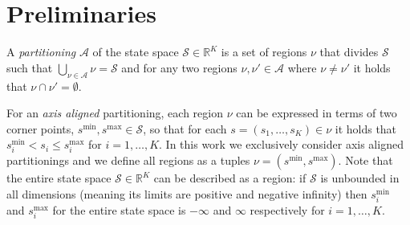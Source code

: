 \section {Preliminaries}%
\label {sec:preliminaries}




\begin {definition}
  \label {def:partitioning}
  A \emph {partitioning} \( \mathcal A \) of the state space $\mathcal{S} \in \mathbb{R}^K$ is a set of regions $\nu$ that divides $\mathcal{S}$ such that $\bigcup_{\nu \in \mathcal{A}}\nu = \mathcal{S}$ and for any two regions $\nu, \nu' \in \mathcal{A}$ where $\nu \neq \nu'$ it holds that $\nu \cap \nu' = \emptyset$.
\end{definition}

For an \textit{axis aligned} partitioning, each region $\nu$ can be expressed in
terms of two corner points, $s^{\min}, s^{\max} \in \mathcal{S}$, so that for
each $s = (s_1, \ldots, s_K) \in \nu$ it holds that $s^{\min}_i < s_i \le
s^{\max}_i$ for $i = 1,\ldots,K$. In this work we exclusively consider axis
aligned partitionings and we define all regions as a tuples $\nu = (s^{\min},
s^{\max})$. Note that the entire state space $\mathcal{S} \in \mathbb{R}^K$ can
be described as a region: if $\mathcal{S}$ is unbounded in all dimensions
(meaning its limits are positive and negative infinity) then $s^{\min}_i$ and
$s^{\max}_i$ for the entire state space is $-\infty$ and $\infty$ respectively
for $i = 1,\ldots,K$.


